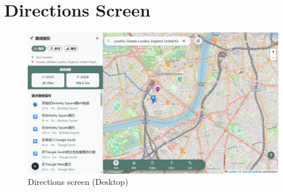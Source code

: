 \section{Directions Screen}
\begin{figure}[H]
    \centering
    \includegraphics[height=0.3\textheight,keepaspectratio]{images/4_directions_desktop.png}
    \caption{Directions screen (Desktop)}
\end{figure}

